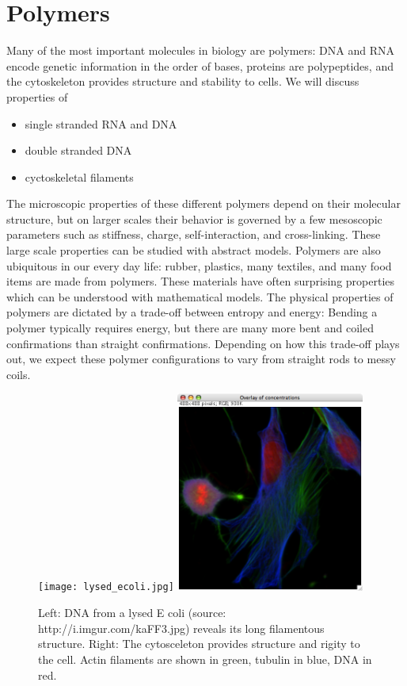 \chapter{Polymers}

Many of the most important molecules in biology are polymers:
DNA and RNA encode genetic information in the order of bases, proteins are polypeptides, and the cytoskeleton provides structure and stability to cells.
We will discuss properties of
\begin{itemize}
	\item single stranded RNA and DNA
	\item double stranded DNA
	\item cyctoskeletal filaments
\end{itemize}
The microscopic properties of these different polymers depend on their molecular structure, but on larger scales their behavior is governed by a few mesoscopic parameters such as stiffness, charge, self-interaction, and cross-linking.
These large scale properties can be studied with abstract models.
Polymers are also ubiquitous in our every day life: rubber, plastics, many textiles, and many food items are made from polymers.
These materials have often surprising properties which can be understood with mathematical models.
The physical properties of polymers are dictated by a trade-off between entropy and energy: Bending a polymer typically requires energy, but there are many more bent and coiled confirmations than straight confirmations.
Depending on how this trade-off plays out, we expect these polymer configurations to vary from straight rods to messy coils.


\begin{figure}[tb]
	\centering
	\texttt{[image: lysed\_ecoli.jpg]}
	\includegraphics[width=0.55\textwidth]{figures/cytosceleton_RGB.png}
	\caption{Left: DNA from a lysed E coli (source: http://i.imgur.com/kaFF3.jpg) reveals its long filamentous structure. Right: The cytosceleton provides structure and rigity to the cell. Actin filaments are shown in green, tubulin in blue, DNA in red.}
	\label{fig:polymer_overview}
\end{figure}

